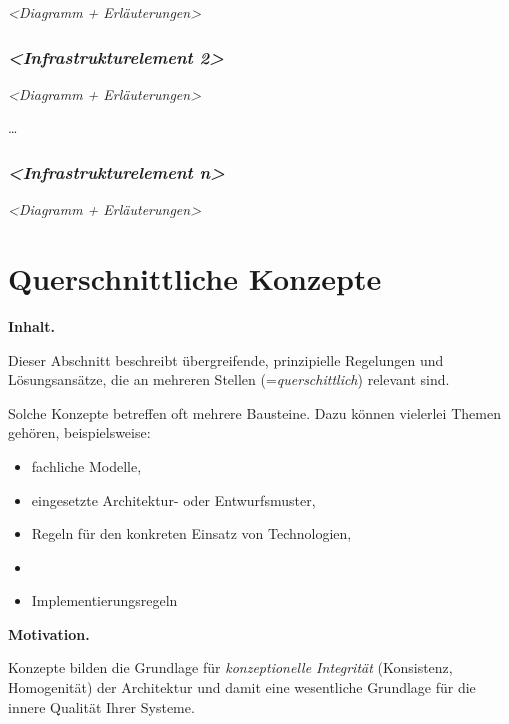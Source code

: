 \documentclass[]{article}
\begin{document}
\emph{\textless{}Diagramm + Erläuterungen\textgreater{}}

\hypertarget{__emphasis_infrastrukturelement_2_emphasis}{%
\subsubsection{\texorpdfstring{\emph{\textless{}Infrastrukturelement
2\textgreater{}}}{\textless{}Infrastrukturelement 2\textgreater{}}}\label{__emphasis_infrastrukturelement_2_emphasis}}

\emph{\textless{}Diagramm + Erläuterungen\textgreater{}}

\ldots{}

\hypertarget{__emphasis_infrastrukturelement_n_emphasis}{%
\subsubsection{\texorpdfstring{\emph{\textless{}Infrastrukturelement
n\textgreater{}}}{\textless{}Infrastrukturelement n\textgreater{}}}\label{__emphasis_infrastrukturelement_n_emphasis}}

\emph{\textless{}Diagramm + Erläuterungen\textgreater{}}

\hypertarget{section-concepts}{%
\section{Querschnittliche Konzepte}\label{section-concepts}}

\textbf{Inhalt.}

Dieser Abschnitt beschreibt übergreifende, prinzipielle Regelungen und
Lösungsansätze, die an mehreren Stellen (=\emph{querschittlich})
relevant sind.

Solche Konzepte betreffen oft mehrere Bausteine. Dazu können vielerlei
Themen gehören, beispielsweise:

\begin{itemize}
\item
  fachliche Modelle,
\item
  eingesetzte Architektur- oder Entwurfsmuster,
\item
  Regeln für den konkreten Einsatz von Technologien,
\item
\item
  Implementierungsregeln
\end{itemize}

\textbf{Motivation.}

Konzepte bilden die Grundlage für \emph{konzeptionelle Integrität}
(Konsistenz, Homogenität) der Architektur und damit eine wesentliche
Grundlage für die innere Qualität Ihrer Systeme.
\end{document}
